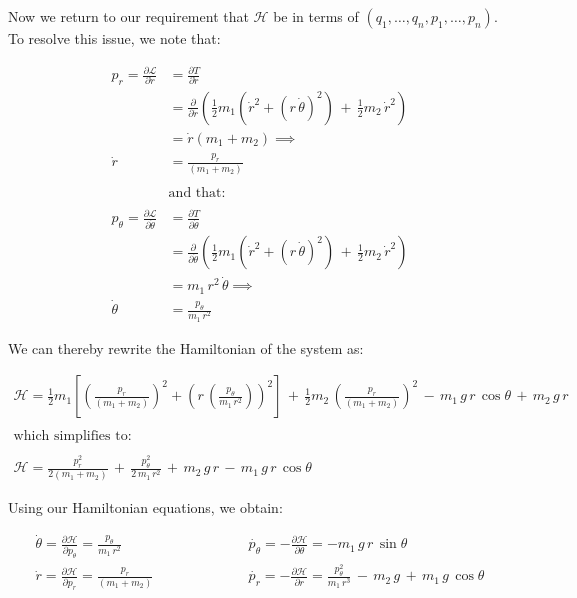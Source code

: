 \documentclass{article}
\begin{document}
Now we return to our requirement that $\mathscr{H}$ be in terms of $(q_{1}, \ldots, q_{n}, p_{1}, \ldots, p_{n})$.  To resolve this issue, we note that:

\begin{align*}
p_{r} = \frac{\partial \mathscr{L}}{\partial \dot{r}} &= \frac{\partial T}{\partial \dot{r}} \\
&= \frac{\partial}{\partial \dot{r}} \left( \frac{1}{2}m_{1}\left( \dot{r}^{2} + (r\,\dot{\theta})^{2} \right) \,+\, \frac{1}{2}m_{2}\,\dot{r}^{2} \right) \\
&= \dot{r}(m_{1} +m_{2}) \implies \\
\dot{r} &= \frac{p_{r}}{(m_{1}+m_{2})} \\
\\
&\text{and that:} \\
\\
p_{\theta} = \frac{\partial \mathscr{L}}{\partial \dot{\theta}} &= \frac{\partial T}{\partial \dot{\theta}} \\
&= \frac{\partial}{\partial \dot{\theta}}\left( \frac{1}{2}m_{1}\left( \dot{r}^{2} + (r\,\dot{\theta})^{2} \right) \,+\, \frac{1}{2}m_{2}\,\dot{r}^{2} \right) \\
&= m_{1} \, r^{2} \, \dot{\theta} \implies \\
\dot{\theta} &= \frac{p_{\theta}}{m_{1}\,r^{2}}
\end{align*}

We can thereby rewrite the Hamiltonian of the system as:

\begin{gather*}
\mathscr{H} = \frac{1}{2}m_{1}\left[ \left(\frac{p_{r}}{(m_{1}+m_{2})}\right)^{2} + \left(r\,\left(\frac{p_{\theta}}{m_{1}\,r^{2}}\right)\right)^{2} \right] \,+\, \frac{1}{2}m_{2}\,\left(\frac{p_{r}}{(m_{1}+m_{2})}\right)^{2} \,-\, m_{1}\,g\,r\,\cos{\theta} \,+\, m_{2}\,g\,r \\
\\
\text{which simplifies to:} \\
\\
\mathscr{H} = \frac{p_{r}^{2}}{2(m_{1}+m_{2})} \,+\, \frac{p_{\theta}^{2}}{2\,m_{1}\,r^{2}} \,+\, m_{2}\,g\,r \,-\, m_{1}\,g\,r\,\cos{\theta}
\end{gather*}

Using our Hamiltonian equations, we obtain:

\begin{align*}
\dot{\theta} = \frac{\partial \mathscr{H}}{\partial p_{\theta}} = \frac{p_{\theta}}{m_{1}\,r^{2}} \qquad&\qquad\qquad \dot{p_{\theta}} = -\frac{\partial \mathscr{H}}{\partial \theta} = -m_{1}\,g\,r\,\sin{\theta} \\
\dot{r} = \frac{\partial \mathscr{H}}{\partial p_{r}} = \frac{p_{r}}{(m_{1}+m_{2})} \qquad&\qquad\qquad \dot{p_{r}} = -\frac{\partial \mathscr{H}}{\partial r} = \frac{p_{\theta}^{2}}{m_{1}\,r^{3}} \,-\, m_{2}\,g \,+\, m_{1}\,g\,\cos{\theta} \\
\end{align*}
\end{document}
